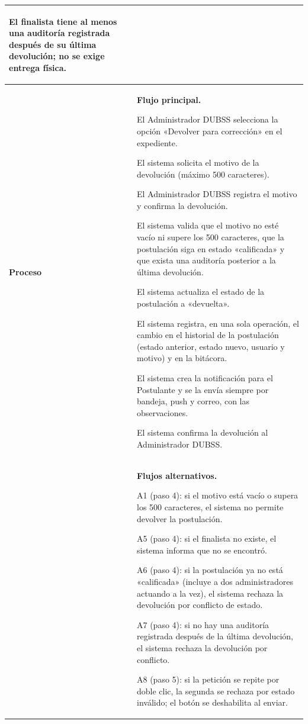 \begin{longtable}{>{\raggedright\arraybackslash}p{2.9cm} >{\raggedright\arraybackslash}p{12.6cm}}
\begin{cuvin}
    \item El finalista tiene al menos una auditoría registrada después de su última devolución; no se exige entrega física.
\end{cuvin} \\
\midrule
\textbf{Proceso} & \textbf{Flujo principal.}
\begin{cupasos}
    \item El Administrador DUBSS selecciona la opción «Devolver para corrección» en el expediente.
    \item El sistema solicita el motivo de la devolución (máximo 500 caracteres).
    \item El Administrador DUBSS registra el motivo y confirma la devolución.
    \item El sistema valida que el motivo no esté vacío ni supere los 500 caracteres, que la postulación siga en estado «calificada» y que exista una auditoría posterior a la última devolución.
    \item El sistema actualiza el estado de la postulación a «devuelta».
    \item El sistema registra, en una sola operación, el cambio en el historial de la postulación (estado anterior, estado nuevo, usuario y motivo) y en la bitácora.
    \item El sistema crea la notificación para el Postulante y se la envía siempre por bandeja, push y correo, con las observaciones.
    \item El sistema confirma la devolución al Administrador DUBSS.
\end{cupasos} \\
 & \textbf{Flujos alternativos.}
\begin{cuvin}
    \item A1 (paso 4): si el motivo está vacío o supera los 500 caracteres, el sistema no permite devolver la postulación.
    \item A5 (paso 4): si el finalista no existe, el sistema informa que no se encontró.
    \item A6 (paso 4): si la postulación ya no está «calificada» (incluye a dos administradores actuando a la vez), el sistema rechaza la devolución por conflicto de estado.
    \item A7 (paso 4): si no hay una auditoría registrada después de la última devolución, el sistema rechaza la devolución por conflicto.
    \item A8 (paso 5): si la petición se repite por doble clic, la segunda se rechaza por estado inválido; el botón se deshabilita al enviar.

\end{cuvin}
\end{longtable}
